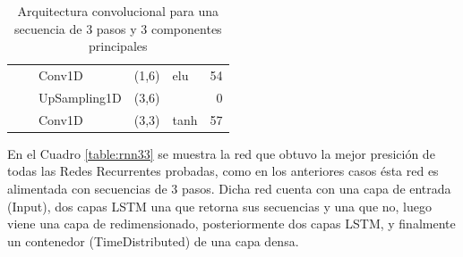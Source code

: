 \begin{table}[H]
\begin{center}
\begin{tabular}{ll|l|r|l|r|}
\multicolumn{1}{|l|}{}                              &                             & Conv1D                             & (1,6)                                & elu                                     & 54                                          \\ \cline{3-6} 
\multicolumn{1}{|l|}{}                              &                             & UpSampling1D                       & (3,6)                                &                                          & 0                                           \\ \cline{3-6} 
\multicolumn{1}{|l|}{}                              &                             & Conv1D                             & \multicolumn{1}{l|}{(3,3)}           & tanh                                     & 57                                          \\ \hline
\end{tabular}
\end{center}
\caption{Arquitectura convolucional para una secuencia de 3 pasos y 3 componentes principales}
\label{table:cnn33}
\end{table}


En el Cuadro \ref{table:rnn33} se muestra la red que obtuvo la mejor presici\'{o}n de todas las Redes Recurrentes probadas, como en los anteriores casos \'{e}sta red es alimentada con secuencias de 3 pasos. Dicha red cuenta con una capa de entrada (Input), dos capas LSTM una que retorna sus secuencias y una que no, luego viene una capa de redimensionado, posteriormente dos capas LSTM, y finalmente un contenedor  (TimeDistributed) de una capa densa.

